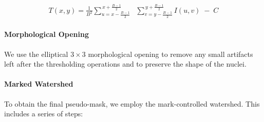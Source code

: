 \begin{align}
\label{eq:adaptive}
T(x,y)
=
\frac{1}{B^2}
\sum_{u = x - \frac{B-1}{2}}^{\,x + \frac{B-1}{2}}
\;\;
\sum_{v = y - \frac{B-1}{2}}^{\,y + \frac{B-1}{2}}
I(u,v)
\;-\; C
\end{align}

\paragraph{Morphological Opening}
We use the elliptical $3\times3$ morphological opening to remove any small artifacts left after the thresholding operations and to preserve the shape of the nuclei.

\paragraph{Marked Watershed}
To obtain the final pseudo-mask, we employ the mark-controlled watershed. This includes a series of steps:
